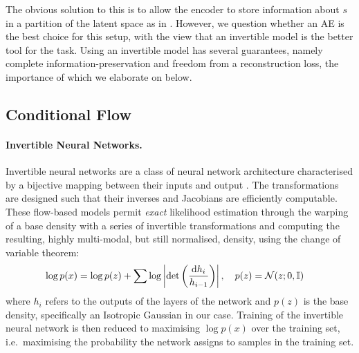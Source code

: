 The obvious solution to this is to allow the encoder to store information about $s$ in a partition of the latent space as in  \citet{creager2019flexibly}.
However, we question whether an \ac{AE} is the best choice for this setup, with the view that an invertible model is the better tool for the task.
Using an invertible model has several guarantees, namely complete information-preservation and freedom from a reconstruction loss, the importance of which we elaborate on below.

\subsection{Conditional Flow}\label{cflow}
\paragraph{Invertible Neural Networks.}
Invertible neural networks are a class of neural network architecture characterised by a bijective mapping between their inputs and output \citep{Dinh2014}. The transformations are designed such that their inverses and Jacobians are efficiently computable.
These flow-based models permit \emph{exact} likelihood estimation \citep{normflows2015} through the warping of a base density with a series of invertible transformations and computing the resulting, highly multi-modal, but still normalised, density, using the change of variable theorem:
\begin{align}
\begin{split}
  \log p(x) &= \log p(z) + 
   \sum \log \left| \det\left( \frac{\diff h_i}{ h_{i-1}}\right) \right|, %
  \quad p(z) = \mathcal{N}(z; 0, \mathbb{I})
  \label{eq:changeofvariables}
\end{split}
\end{align}
where $h_i$ refers to the outputs of the layers of the network and $p(z)$ is the base density, specifically an Isotropic Gaussian in our case.
Training of the invertible neural network is then reduced to maximising $\log p(x)$ over the training set,
i.e.\ maximising the probability the network assigns to samples in the training set.


